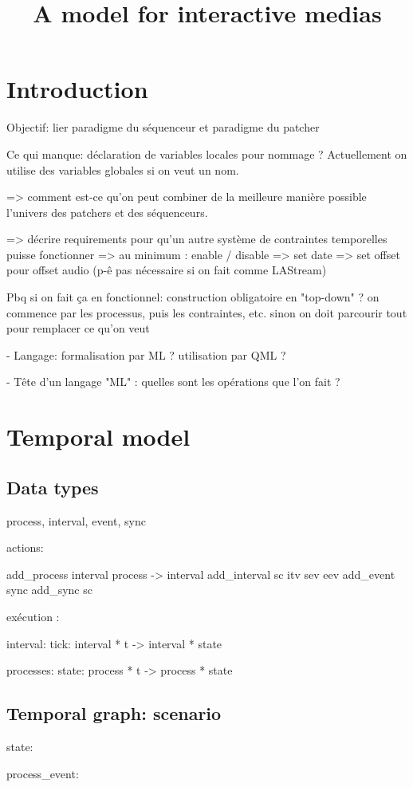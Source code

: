 \documentclass[a4paper]{article}
\title{A model for interactive medias}
\begin{document}
\section{Introduction}
Objectif: lier paradigme du séquenceur et paradigme du patcher

Ce qui manque: déclaration de variables locales pour nommage ? Actuellement on utilise des variables globales si on veut un nom.

=> comment est-ce qu'on peut combiner de la meilleure manière possible l'univers des patchers et des séquenceurs.

=> décrire requirements pour qu'un autre système de contraintes temporelles puisse fonctionner 
=> au minimum : enable / disable
=> set date
=> set offset pour offset audio (p-ê pas nécessaire si on fait comme LAStream)

Pbq si on fait ça en fonctionnel: construction obligatoire en "top-down" ? on commence par les processus, puis les contraintes, etc. 
sinon on doit parcourir tout pour remplacer ce qu'on veut

- Langage: formalisation par ML ? utilisation par QML ?

- Tête d'un langage "ML" : quelles sont les opérations que l'on fait ? 

\section{Temporal model}
\subsection{Data types}
process, interval, event, sync

actions: 

add_process interval process -> interval
add_interval sc itv sev eev
add_event sync
add_sync sc

exécution : 

interval: 
  tick: interval * t -> interval * state

processes:
  state: process * t -> process * state

\subsection{Temporal graph: scenario}

state:

process_event:
\end{document}
